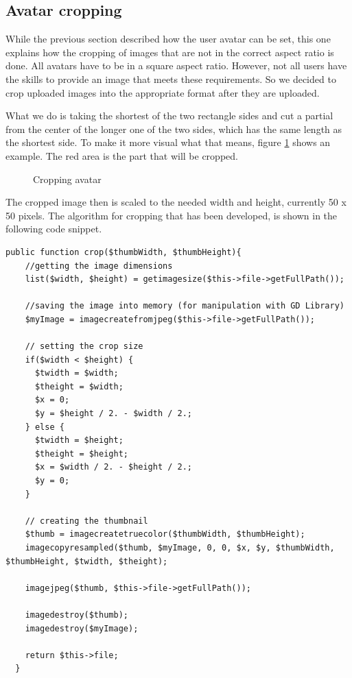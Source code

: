 \subsection{Avatar cropping}

While the previous section described how the user avatar can be set, this one explains how the cropping of images that are not in the correct aspect ratio is done. All avatars have to be in a square aspect ratio. However, not all users have the skills to provide an image that meets these requirements. So we decided to crop uploaded images into the appropriate format after they are uploaded.

What we do is taking the shortest of the two rectangle sides and cut a partial from the center of the longer one of the two sides, which has the same length as the shortest side. To make it more visual what that means, figure \ref{fig:cropping-avatar} shows an example. The red area is the part that will be cropped.

\begin{figure}[!h]
  \centering
  \caption{Cropping avatar}
  \label{fig:cropping-avatar}
\end{figure}

The cropped image then is scaled to the needed width and height, currently 50 x 50 pixels. The algorithm for cropping that has been developed, is shown in the following code snippet.

\begin{lstlisting}[caption=Cropping an image to a square aspect ratio]
public function crop($thumbWidth, $thumbHeight){
    //getting the image dimensions
    list($width, $height) = getimagesize($this->file->getFullPath());
    
    //saving the image into memory (for manipulation with GD Library)
    $myImage = imagecreatefromjpeg($this->file->getFullPath());

    // setting the crop size
    if($width < $height) {
      $twidth = $width;
      $theight = $width;
      $x = 0;
      $y = $height / 2. - $width / 2.;
    } else {
      $twidth = $height;
      $theight = $height;
      $x = $width / 2. - $height / 2.;
      $y = 0;
    }

    // creating the thumbnail
    $thumb = imagecreatetruecolor($thumbWidth, $thumbHeight);
    imagecopyresampled($thumb, $myImage, 0, 0, $x, $y, $thumbWidth, $thumbHeight, $twidth, $theight);

    imagejpeg($thumb, $this->file->getFullPath());

    imagedestroy($thumb);
    imagedestroy($myImage);

    return $this->file;
  }
\end{lstlisting}
